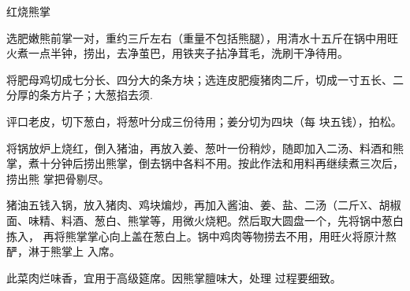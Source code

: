 \begin{recipe}{红烧熊掌}

\ingredients


\cooking

\step 选肥嫩熊前掌一对，重约三斤左右（重量不包括熊腿），用清水十五斤在锅中用旺
火煮一点半钟，捞出，去净茧巴，用铁夹子拈净茸毛，洗刷干净待用。

\step 将肥母鸡切成七分长、四分大的条方块；选连皮肥瘦猪肉二斤，切成一寸五长、二
分厚的条方片子；大葱掐去须.

评口老皮，切下葱白，将葱叶分成三份待用；姜分切为四块（每 块五钱），拍松。

\step 将锅放炉上烧红，倒入猪油，再放入姜、葱叶一份稍炒，随即加入二汤、料酒和熊
掌，煮十分钟后捞出熊掌，倒去锅中各料不用。按此作法和用料再继续煮三次后，捞出熊
掌把骨剔尽。

\step 猪油五钱入锅，放入猪肉、鸡块煸炒，再加入酱油、姜、盐、二汤（二斤X、胡椒
面、味精、料酒、葱白、熊掌等，用微火烧粑。然后取大圆盘一个，先将锅中葱白拣入，
再将熊掌掌心向上盖在葱白上。锅中鸡肉等物捞去不用，用旺火将原汁熬酽，淋于熊掌上
入席。

\notes

此菜肉烂味香，宜用于高级筵席。因熊掌膻味大，处理 过程要细致。

\end{recipe}

